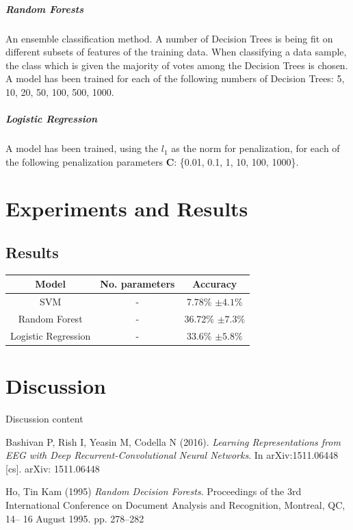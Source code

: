 \documentclass{article}
\begin{document}
\subparagraph{Random Forests}
An ensemble classification method. A number of Decision Trees is being fit on different subsets of features of the training data. When classifying a data sample, the class which is given the majority of votes among the Decision Trees is chosen. A model has been trained for each of the following numbers of Decision Trees: 5, 10, 20, 50, 100, 500, 1000.

\subparagraph{Logistic Regression}
A model has been trained, using the $l_1$ as the norm for penalization, for each of the following penalization parameters \textbf{C}: \{0.01, 0.1, 1, 10, 100, 1000\}.

\section{Experiments and Results}
\subsection{Results}
\begin{center}
\begin{tabular}{ c|c|c } 
 Model & No. parameters & Accuracy \\ 
 \hline
 SVM & - & 7.78\% $\pm 4.1\% $\\ 
 Random Forest & - & 36.72\% $\pm 7.3\%$ \\ 
 Logistic Regression & - & 33.6\% $\pm 5.8\%$ \\ 
\end{tabular}
\end{center}

\section{Discussion}
Discussion content

\begin{thebibliography}{9}

	Bashivan  P,  Rish  I,  Yeasin  M,  Codella  N  (2016). 
	\textit{Learning  Representations from  EEG with  Deep Recurrent-Convolutional  Neural Networks}. 
	In arXiv:1511.06448 [cs]. arXiv: 1511.06448

	Ho, Tin Kam (1995)
	\textit{Random Decision Forests}. 
	Proceedings of the 3rd International Conference on Document Analysis and Recognition, Montreal, QC, 14–		16 August 1995. pp. 278–282
	
\end{thebibliography}
\end{document}
